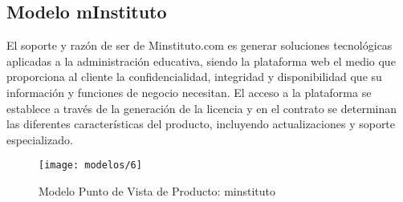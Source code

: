   \subsection{Modelo mInstituto}
  El soporte y razón de ser de Minstituto.com es generar soluciones tecnológicas aplicadas a la administración educativa, siendo la plataforma web el medio que proporciona al cliente la confidencialidad, integridad y disponibilidad que su información y funciones de negocio necesitan.  El acceso a la plataforma se establece a través de la generación de la licencia y en el contrato se determinan las diferentes características del producto, incluyendo actualizaciones y soporte especializado.

  \begin{figure}[H]
	\centering
	\texttt{[image: modelos/6]}
	\captionsetup{width=.95\textwidth}
	\caption{Modelo Punto de Vista de Producto: minstituto}
	\label{modelo6}
  \end{figure}
